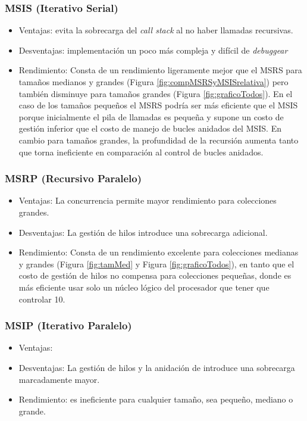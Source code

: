 \documentclass[titlepage]{article}
\begin{document}
\subsubsection{MSIS (Iterativo Serial)}
\begin{itemize}
	\item Ventajas: evita la sobrecarga del \textit{call stack} al no haber llamadas recursivas.
	\item Desventajas: implementación un poco más compleja y difícil de \textit{debuggear}
	\item Rendimiento: Consta de un rendimiento ligeramente mejor que el MSRS para tamaños medianos y grandes (Figura \ref{fig:compMSRSyMSISrelativa}) pero también disminuye para tamaños grandes (Figura \ref{fig:graficoTodos}). En el caso de los tamaños pequeños el MSRS podría ser más eficiente que el MSIS porque inicialmente el pila de llamadas es pequeña y supone un costo de gestión inferior que el costo de manejo de bucles anidados del MSIS. En cambio para tamaños grandes, la profundidad de la recursión aumenta tanto que torna ineficiente en comparación al control de bucles anidados.
\end{itemize}

\subsubsection{MSRP (Recursivo Paralelo)}
\begin{itemize}
	\item Ventajas: La concurrencia permite mayor rendimiento para colecciones grandes.
	\item Desventajas: La gestión de hilos introduce una sobrecarga adicional.
	\item Rendimiento: Consta de un rendimiento excelente para colecciones medianas y grandes (Figura \ref{fig:tamMed} y Figura \ref{fig:graficoTodos}), en tanto que el costo de gestión de hilos no compensa para colecciones pequeñas, donde es más eficiente usar solo un núcleo lógico del procesador que tener que controlar 10.
\end{itemize}
\subsubsection{MSIP (Iterativo Paralelo)}
\begin{itemize}
	\item Ventajas:
	\item Desventajas: La gestión de hilos y la anidación de introduce una sobrecarga marcadamente mayor.
	\item Rendimiento: es ineficiente para cualquier tamaño, sea pequeño, mediano o grande.
\end{itemize}
\end{document}
